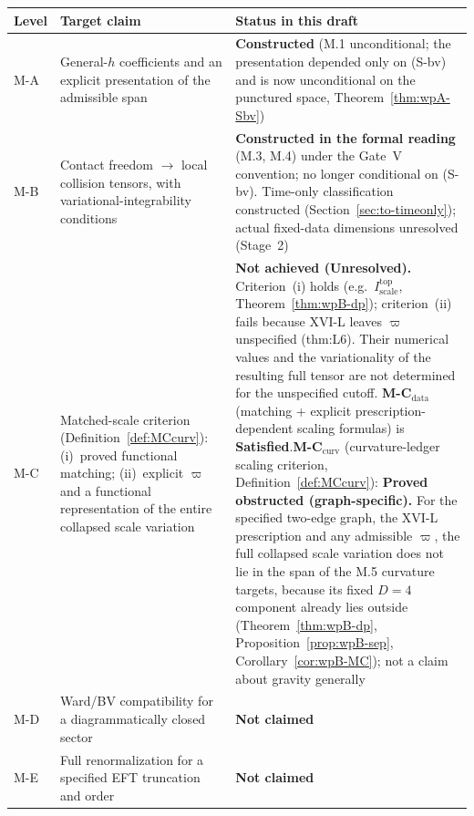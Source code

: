 \documentclass{article}
\theoremstyle{remark}
\begin{document}
\begin{center}
\begin{longtable}{p{}p{}p{}}
\hline
Level & Target claim & Status in this draft\\
\hline
M-A & General-$h$ coefficients and an explicit presentation of the admissible span & \textbf{Constructed} (M.1 unconditional; the presentation depended only on (S-bv) and is now unconditional on the punctured space, Theorem~\ref{thm:wpA-Sbv})\\
M-B & Contact freedom $\to$ local collision tensors, with variational-integrability conditions & \textbf{Constructed in the formal reading} (M.3, M.4) under the Gate~V convention; no longer conditional on (S-bv). Time-only classification constructed (Section~\ref{sec:to-timeonly}); actual fixed-data dimensions unresolved (Stage~2)\\
M-C & Matched-scale criterion (Definition~\ref{def:MCcurv}): (i)~proved functional matching; (ii)~explicit $\varpi$ and a functional representation of the entire collapsed scale variation & \textbf{Not achieved (Unresolved).} Criterion~(i) holds (e.g.\ $I^{\mathrm{top}}_{\mathrm{scale}}$, Theorem~\ref{thm:wpB-dp}); criterion~(ii) fails because XVI-L leaves $\varpi$ unspecified (thm:L6). Their numerical values and the variationality of the resulting full tensor are not determined for the unspecified cutoff. \textbf{M-C$_{\mathrm{data}}$} (matching + explicit prescription-dependent scaling formulas) is \textbf{Satisfied}.\newline \textbf{M-C$_{\mathrm{curv}}$} (curvature-ledger scaling criterion, Definition~\ref{def:MCcurv}): \textbf{Proved obstructed (graph-specific).} For the specified two-edge graph, the XVI-L prescription and any admissible $\varpi$, the full collapsed scale variation does not lie in the span of the M.5 curvature targets, because its fixed $D=4$ component already lies outside (Theorem~\ref{thm:wpB-dp}, Proposition~\ref{prop:wpB-sep}, Corollary~\ref{cor:wpB-MC}); not a claim about gravity generally\\
M-D & Ward/BV compatibility for a diagrammatically closed sector & \textbf{Not claimed}\\
M-E & Full renormalization for a specified EFT truncation and order & \textbf{Not claimed}\\
\hline
\end{longtable}
\end{center}

\end{document}
